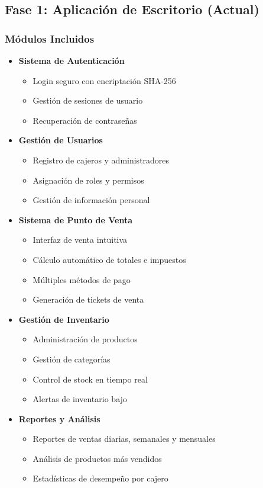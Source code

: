\documentclass[12pt,letterpaper]{article}
\begin{document}
\subsection{Fase 1: Aplicación de Escritorio (Actual)}

\subsubsection{Módulos Incluidos}
\begin{itemize}
    \item \textbf{Sistema de Autenticación}
    \begin{itemize}
        \item Login seguro con encriptación SHA-256
        \item Gestión de sesiones de usuario
        \item Recuperación de contraseñas
    \end{itemize}
    
    \item \textbf{Gestión de Usuarios}
    \begin{itemize}
        \item Registro de cajeros y administradores
        \item Asignación de roles y permisos
        \item Gestión de información personal
    \end{itemize}
    
    \item \textbf{Sistema de Punto de Venta}
    \begin{itemize}
        \item Interfaz de venta intuitiva
        \item Cálculo automático de totales e impuestos
        \item Múltiples métodos de pago
        \item Generación de tickets de venta
    \end{itemize}
    
    \item \textbf{Gestión de Inventario}
    \begin{itemize}
        \item Administración de productos
        \item Gestión de categorías
        \item Control de stock en tiempo real
        \item Alertas de inventario bajo
    \end{itemize}
    
    \item \textbf{Reportes y Análisis}
    \begin{itemize}
        \item Reportes de ventas diarias, semanales y mensuales
        \item Análisis de productos más vendidos
        \item Estadísticas de desempeño por cajero
    \end{itemize}
\end{itemize}
\end{document}
